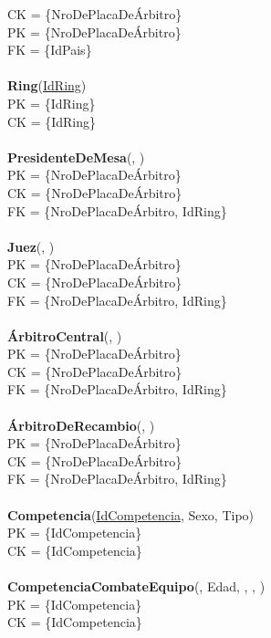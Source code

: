 CK = \{NroDePlacaDeÁrbitro\}\\
PK = \{NroDePlacaDeÁrbitro\}\\
FK = \{IdPais\}\\
\\
\textbf{Ring}(\uline{IdRing})\\
PK = \{IdRing\}\\
CK = \{IdRing\}\\
\\
\textbf{PresidenteDeMesa}(, )\\
PK = \{NroDePlacaDeÁrbitro\}\\
CK = \{NroDePlacaDeÁrbitro\}\\
FK = \{NroDePlacaDeÁrbitro, IdRing\}\\
\\
\textbf{Juez}(, )\\
PK = \{NroDePlacaDeÁrbitro\}\\
CK = \{NroDePlacaDeÁrbitro\}\\
FK = \{NroDePlacaDeÁrbitro, IdRing\}\\
\\
\textbf{ÁrbitroCentral}(, )\\
PK = \{NroDePlacaDeÁrbitro\}\\
CK = \{NroDePlacaDeÁrbitro\}\\
FK = \{NroDePlacaDeÁrbitro, IdRing\}\\
\\
\textbf{ÁrbitroDeRecambio}(, )\\
PK = \{NroDePlacaDeÁrbitro\}\\
CK = \{NroDePlacaDeÁrbitro\}\\
FK = \{NroDePlacaDeÁrbitro, IdRing\}\\
\\
\textbf{Competencia}(\uline{IdCompetencia}, Sexo, Tipo)\\
PK = \{IdCompetencia\}\\
CK = \{IdCompetencia\}\\
\\
\textbf{CompetenciaCombateEquipo}(, Edad, , , )\\
PK = \{IdCompetencia\}\\
CK = \{IdCompetencia\}\\
